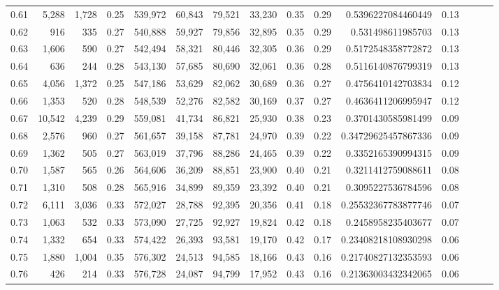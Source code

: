 \begin{tabular}{rrrrrrrrrrrrrrr}
0.61 &   5,288 &  1,728 &  0.25 &  539,972 &   60,843 &   79,521 &   33,230 &  0.35 &  0.29 &    0.5396227084460449 &      0.13 \\
0.62 &     916 &    335 &  0.27 &  540,888 &   59,927 &   79,856 &   32,895 &  0.35 &  0.29 &     0.531498611985703 &      0.13 \\
0.63 &   1,606 &    590 &  0.27 &  542,494 &   58,321 &   80,446 &   32,305 &  0.36 &  0.29 &    0.5172548358772872 &      0.13 \\
0.64 &     636 &    244 &  0.28 &  543,130 &   57,685 &   80,690 &   32,061 &  0.36 &  0.28 &    0.5116140876799319 &      0.13 \\
0.65 &   4,056 &  1,372 &  0.25 &  547,186 &   53,629 &   82,062 &   30,689 &  0.36 &  0.27 &    0.4756410142703834 &      0.12 \\
0.66 &   1,353 &    520 &  0.28 &  548,539 &   52,276 &   82,582 &   30,169 &  0.37 &  0.27 &    0.4636411206995947 &      0.12 \\
0.67 &  10,542 &  4,239 &  0.29 &  559,081 &   41,734 &   86,821 &   25,930 &  0.38 &  0.23 &    0.3701430585981499 &      0.09 \\
0.68 &   2,576 &    960 &  0.27 &  561,657 &   39,158 &   87,781 &   24,970 &  0.39 &  0.22 &   0.34729625457867336 &      0.09 \\
0.69 &   1,362 &    505 &  0.27 &  563,019 &   37,796 &   88,286 &   24,465 &  0.39 &  0.22 &    0.3352165390994315 &      0.09 \\
0.70 &   1,587 &    565 &  0.26 &  564,606 &   36,209 &   88,851 &   23,900 &  0.40 &  0.21 &    0.3211412759088611 &      0.08 \\
0.71 &   1,310 &    508 &  0.28 &  565,916 &   34,899 &   89,359 &   23,392 &  0.40 &  0.21 &    0.3095227536784596 &      0.08 \\
0.72 &   6,111 &  3,036 &  0.33 &  572,027 &   28,788 &   92,395 &   20,356 &  0.41 &  0.18 &   0.25532367783877746 &      0.07 \\
0.73 &   1,063 &    532 &  0.33 &  573,090 &   27,725 &   92,927 &   19,824 &  0.42 &  0.18 &    0.2458958235403677 &      0.07 \\
0.74 &   1,332 &    654 &  0.33 &  574,422 &   26,393 &   93,581 &   19,170 &  0.42 &  0.17 &   0.23408218108930298 &      0.06 \\
0.75 &   1,880 &  1,004 &  0.35 &  576,302 &   24,513 &   94,585 &   18,166 &  0.43 &  0.16 &   0.21740827132353593 &      0.06 \\
0.76 &     426 &    214 &  0.33 &  576,728 &   24,087 &   94,799 &   17,952 &  0.43 &  0.16 &   0.21363003432342065 &      0.06 \\

\end{tabular}
